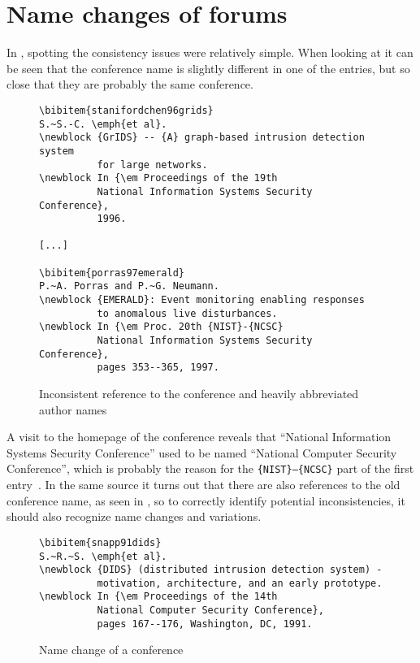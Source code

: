 \section{Name changes of forums}
\label{sec:problems_name_changes}

In , spotting the consistency
issues were relatively simple.  When looking at
 it can be seen that the
conference name is slightly different in one of the entries, but so
close that they are probably the same conference.

\begin{figure}
  \centering
\begin{small}
\begin{verbatim}
\bibitem{stanifordchen96grids}
S.~S.-C. \emph{et al}.
\newblock {GrIDS} -- {A} graph-based intrusion detection system
          for large networks.
\newblock In {\em Proceedings of the 19th
          National Information Systems Security Conference},
          1996.

[...]

\bibitem{porras97emerald}
P.~A. Porras and P.~G. Neumann.
\newblock {EMERALD}: Event monitoring enabling responses
          to anomalous live disturbances.
\newblock In {\em Proc. 20th {NIST}-{NCSC}
          National Information Systems Security Conference},
          pages 353--365, 1997.

\end{verbatim}
\end{small}
  \caption{Inconsistent reference to the conference and heavily abbreviated author names}
\label{fig:entry_journal_name_authors}
\end{figure}

A visit to the homepage of the conference reveals that ``National
Information Systems Security Conference'' used to be named ``National
Computer Security Conference'', which is probably the reason for the
\texttt{\{NIST\}--\{NCSC\}} part of the first entry~\cite{nist2014_nissc}.  In
the same source it turns out that there are also references to the old
conference name, as seen in , so to
correctly identify potential inconsistencies, it should also recognize
name changes and variations.

\begin{figure}
  \centering
\begin{small}
\begin{verbatim}
\bibitem{snapp91dids}
S.~R.~S. \emph{et al}.
\newblock {DIDS} (distributed intrusion detection system) -
          motivation, architecture, and an early prototype.
\newblock In {\em Proceedings of the 14th
          National Computer Security Conference},
          pages 167--176, Washington, DC, 1991.
\end{verbatim}
\end{small}
  \caption{Name change of a conference}
\label{fig:conference_name}
\end{figure}

